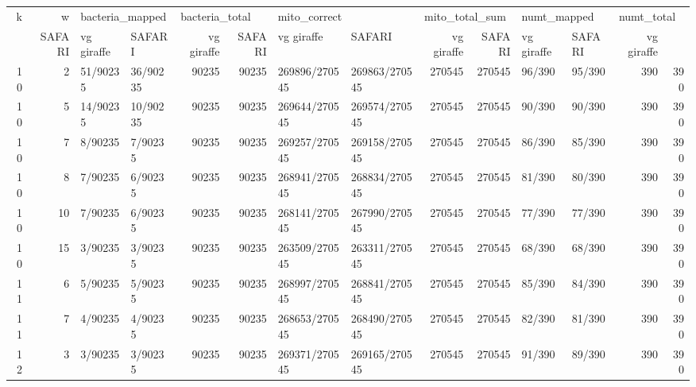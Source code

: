 \begin{tabular}{rrllrrllrrllrr}
\toprule
   k &    w & \multicolumn{2}{l}{bacteria_mapped} & \multicolumn{2}{l}{bacteria_total} & \multicolumn{2}{l}{mito_correct} & \multicolumn{2}{l}{mito_total_sum} & \multicolumn{2}{l}{numt_mapped} & \multicolumn{2}{l}{numt_total} \\
     &          SAFARI & vg giraffe &         SAFARI & vg giraffe &        SAFARI &    vg giraffe &         SAFARI & vg giraffe &      SAFARI & vg giraffe &     SAFARI & vg giraffe \\
\midrule
10 &  2 &        51/90235 &   36/90235 &          90235 &      90235 & 269896/270545 & 269863/270545 &         270545 &     270545 &      96/390 &     95/390 &        390 &        390 \\
10 &  5 &        14/90235 &   10/90235 &          90235 &      90235 & 269644/270545 & 269574/270545 &         270545 &     270545 &      90/390 &     90/390 &        390 &        390 \\
10 &  7 &         8/90235 &    7/90235 &          90235 &      90235 & 269257/270545 & 269158/270545 &         270545 &     270545 &      86/390 &     85/390 &        390 &        390 \\
10 &  8 &         7/90235 &    6/90235 &          90235 &      90235 & 268941/270545 & 268834/270545 &         270545 &     270545 &      81/390 &     80/390 &        390 &        390 \\
10 & 10 &         7/90235 &    6/90235 &          90235 &      90235 & 268141/270545 & 267990/270545 &         270545 &     270545 &      77/390 &     77/390 &        390 &        390 \\
10 & 15 &         3/90235 &    3/90235 &          90235 &      90235 & 263509/270545 & 263311/270545 &         270545 &     270545 &      68/390 &     68/390 &        390 &        390 \\
11 &  6 &         5/90235 &    5/90235 &          90235 &      90235 & 268997/270545 & 268841/270545 &         270545 &     270545 &      85/390 &     84/390 &        390 &        390 \\
11 &  7 &         4/90235 &    4/90235 &          90235 &      90235 & 268653/270545 & 268490/270545 &         270545 &     270545 &      82/390 &     81/390 &        390 &        390 \\
12 &  3 &         3/90235 &    3/90235 &          90235 &      90235 & 269371/270545 & 269165/270545 &         270545 &     270545 &      91/390 &     89/390 &        390 &        390 \\

\end{tabular}
